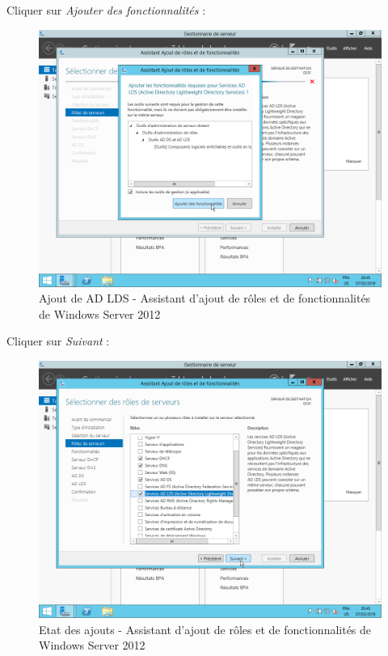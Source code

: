 \newpage
Cliquer sur \textit{Ajouter des fonctionnalités} :
\begin{figure}[h!]
    \begin{center}
        \includegraphics[scale=0.6]{WS2012_Screenshots/24.png}
        \caption{Ajout de AD LDS - Assistant d'ajout de rôles et de fonctionnalités de Windows Server 2012}
        \label{WS2012_Screenshots/24}
    \end{center}
\end{figure}
\FloatBarrier

\newpage
Cliquer sur \textit{Suivant} :
\begin{figure}[h!]
    \begin{center}
        \includegraphics[scale=0.6]{WS2012_Screenshots/25.png}
        \caption{Etat des ajouts - Assistant d'ajout de rôles et de fonctionnalités de Windows Server 2012}
        \label{WS2012_Screenshots/25}
    \end{center}
\end{figure}
\FloatBarrier

